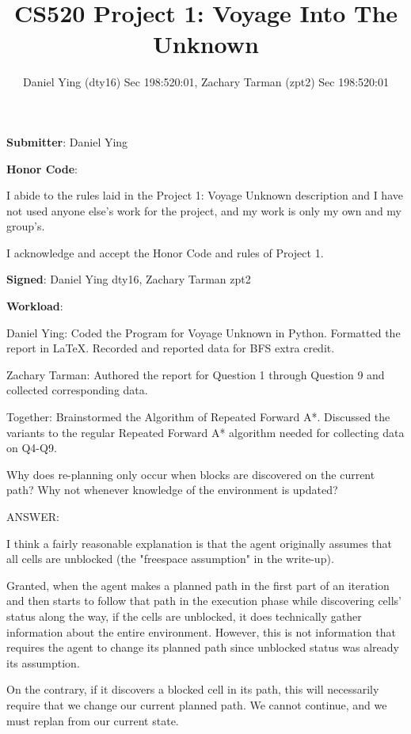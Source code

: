 \documentclass{homeworg}
\title{CS520 Project 1: Voyage Into The Unknown}
\author{Daniel Ying (dty16) Sec 198:520:01, Zachary Tarman (zpt2) Sec 198:520:01}
\begin{document}
\maketitle

\textbf{Submitter}: Daniel Ying

\textbf{Honor Code}:

I abide to the rules laid in the Project 1: Voyage Unknown description and I have not used anyone else’s work for the project, and my work is only my own and my group’s.

\hrulefill

I acknowledge and accept the Honor Code and rules of Project 1.

\textbf{Signed}: Daniel Ying dty16, Zachary Tarman zpt2

\hrulefill

\textbf{Workload}: 

Daniel Ying: Coded the Program for Voyage Unknown in Python. Formatted the report in LaTeX. Recorded and reported data for BFS extra credit.

Zachary Tarman: Authored the report for Question 1 through Question 9 and collected corresponding data.

Together: Brainstormed the Algorithm of Repeated Forward A*. Discussed the variants to the regular Repeated Forward A* algorithm needed for collecting data on Q4-Q9.
\vspace{.5cm}

\newpage
\exercise
Why does re-planning only occur when blocks are discovered on the current path? Why not whenever knowledge of the environment is updated?

ANSWER:

I think a fairly reasonable explanation is that the agent originally assumes that all cells are unblocked (the "freespace assumption" in the write-up). 

Granted, when the agent makes a planned path in the first part of an iteration and then starts to follow that path in the execution phase while discovering cells' status along the way, if the cells are unblocked, it does technically gather information about the entire environment. However, this is not information that requires the agent to change its planned path since unblocked status was already its assumption. 

On the contrary, if it discovers a blocked cell in its path, this will necessarily require that we change our current planned path. We cannot continue, and we must replan from our current state.
\end{document}
